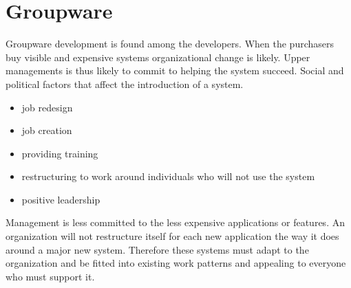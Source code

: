 \section{Groupware}
Groupware development is found among the developers.
When the purchasers buy visible and expensive systems organizational change is likely.
Upper managements is thus likely to commit to helping the system succeed.
Social and political factors that affect the introduction of a system.
\begin{itemize}
\item job redesign 
\item job creation
\item providing training
\item restructuring to work around individuals who will not use the system
\item positive leadership
\end{itemize}

Management is less committed to the less expensive applications or features.
An organization will not restructure itself for each new application the way it does around a major new system. Therefore these systems must adapt to the organization and be fitted into existing work patterns and appealing to everyone who must support it. 

